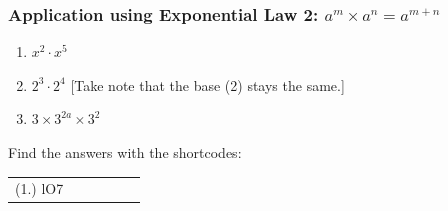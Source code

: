             \subsubsection{  Application using Exponential Law 2: ${a}^{m}\ensuremath{\times}{a}^{n}={a}^{m+n}$ }
            \nopagebreak
        \label{m38359*id64269}\begin{enumerate}[noitemsep, label=\textbf{\arabic*}. ] 
            \label{m38359*uid13}\item 
            \begin{math}{x}^{2}\ensuremath{\cdot}{x}^{5}\end{math}
      \label{m38359*uid14}\item 
        \begin{math}{2}^{3}\ensuremath{\cdot}{2}^{4}\end{math}
        [Take note that the base (2) stays the same.]
      \label{m38359*uid15}\item 
        \begin{math}3\ensuremath{\times}{3}^{2a}\ensuremath{\times}{3}^{2}\end{math}
\newline
\newline
          \end{enumerate}
      \label{m38359*uid16}
\par {} Find the answers with the shortcodes:
 \par \begin{tabular}[h]{cccccc}
 (1.) lO7  & \end{tabular}
